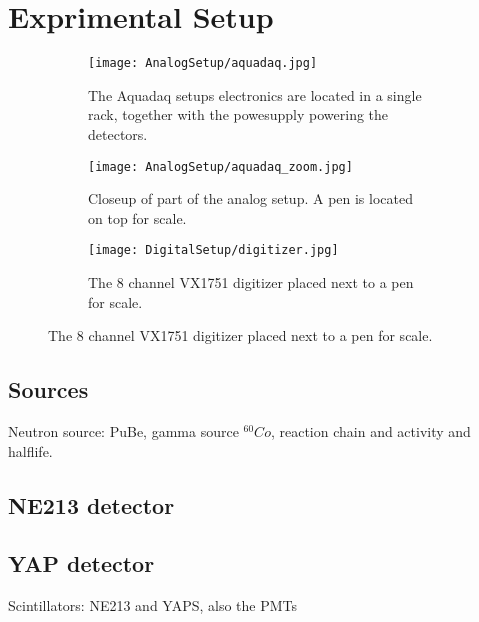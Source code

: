 \documentclass[main.tex]{subfiles}
\begin{document}
\section{Exprimental Setup}
\begin{figure}[ht]
	\begin{subfigure}[b]{0.39\textwidth}
	    \centering
    	    \texttt{[image: AnalogSetup/aquadaq.jpg]}
        	\caption{The Aquadaq setups electronics are located in a single rack, together with the powesupply powering the detectors.}
	    \label{fig:aquadaq_image} 
	\end{subfigure}
	\begin{subfigure}[b]{0.3\textwidth}
	    \centering
    	    \texttt{[image: AnalogSetup/aquadaq\_zoom.jpg]}
        	\caption{Closeup of part of the analog setup. A pen is located on top for scale.}
	    \label{fig:aquadaq_zoom_image} 
	\end{subfigure}
	\begin{subfigure}[b]{0.3\textwidth}
    	\centering
        	\texttt{[image: DigitalSetup/digitizer.jpg]}
        	\caption{The 8 channel VX1751 digitizer placed next to a pen for scale.}
    	\label{fig:aquadaq_image} 
    \end{subfigure}
\end{figure}

\subsection{Sources}
Neutron source: PuBe, gamma source $^{60}Co$, reaction chain and activity and halflife.



\subsection{NE213 detector}
\subsection{YAP detector}
Scintillators: NE213 and YAPS, also the PMTs
\end{document}
